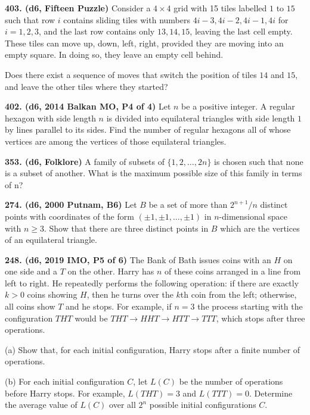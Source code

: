 \documentclass{article}
\begin{document}
        \textbf{403. (\color{red}d6\color{black}, Fifteen Puzzle)} Consider a $4 \times 4$ grid with 15 tiles labelled $1$ to $15$ such that row $i$ contains sliding tiles with numbers $4i-3, 4i-2, 4i-1, 4i$ for $i=1,2,3$, and the last row contains only $13, 14, 15$, leaving the last cell empty. These tiles can move up, down, left, right, provided they are moving into an empty square. In doing so, they leave an empty cell behind.

        Does there exist a sequence of moves that switch the position of tiles $14$ and $15$, and leave the other tiles where they started?

        \textbf{402. (\color{red}d6\color{black}, 2014 Balkan MO, P4 of 4)} Let $n$ be a positive integer. A regular hexagon with side length $n$ is divided into equilateral triangles with side length $1$ by lines parallel to its sides.
        Find the number of regular hexagons all of whose vertices are among the vertices of those equilateral triangles.

        \textbf{353. (\color{red}d6\color{black}, Folklore)} A family of subsets of $\{1, 2, \dots, 2n\}$ is chosen such that none is a subset of another. What is the maximum possible size of this family in terms of n?

        \textbf{274. (\color{red}d6\color{black}, 2000 Putnam, B6)} Let $B$ be a set of more than $2^{n+1}/n$ distinct points with coordinates of the form $(\pm 1,\pm 1,\ldots,\pm 1)$ in $n$-dimensional space with $n\geq 3$. Show that there are three distinct points in $B$ which are the vertices of an equilateral triangle.

        \textbf{248. (\color{red}d6\color{black}, 2019 IMO, P5 of 6)} The Bank of Bath issues coins with an $H$ on one side and a $T$ on the other. Harry has $n$ of these coins arranged in a line from left to right. He repeatedly performs the following operation: if there are exactly $k>0$ coins showing $H$, then he turns over the $k$th coin from the left; otherwise, all coins show $T$ and he stops. For example, if $n=3$ the process starting with the configuration $THT$ would be $THT \to HHT  \to HTT \to TTT$, which stops after three operations.



        (a) Show that, for each initial configuration, Harry stops after a finite number of operations.



        (b) For each initial configuration $C$, let $L(C)$ be the number of operations before Harry stops. For example, $L(THT) = 3$ and $L(TTT) = 0$. Determine the average value of $L(C)$ over all $2^n$ possible initial configurations $C$.
\end{document}
